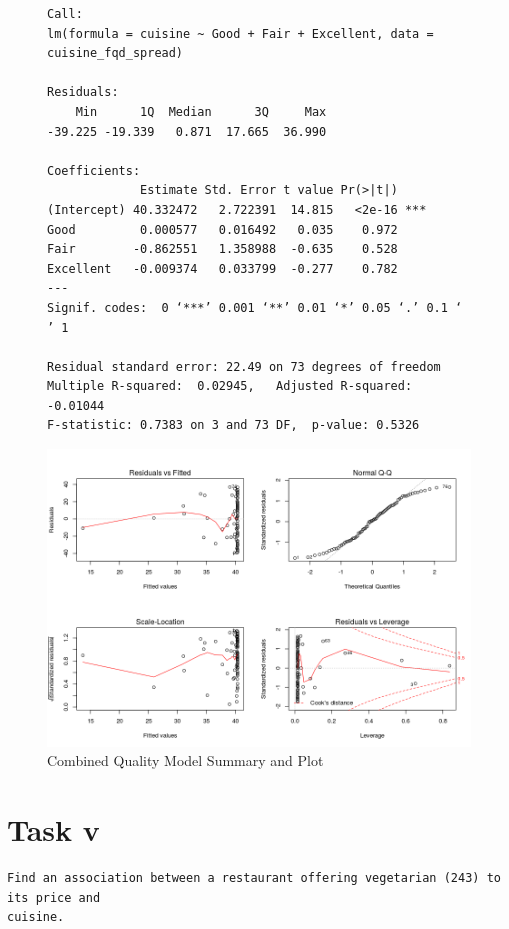\documentclass[letterpaper,10pt]{article}
\begin{document}
\begin{figure}[h]
\begin{verbatim}
Call:
lm(formula = cuisine ~ Good + Fair + Excellent, data = cuisine_fqd_spread)

Residuals:
    Min      1Q  Median      3Q     Max 
-39.225 -19.339   0.871  17.665  36.990 

Coefficients:
             Estimate Std. Error t value Pr(>|t|)    
(Intercept) 40.332472   2.722391  14.815   <2e-16 ***
Good         0.000577   0.016492   0.035    0.972    
Fair        -0.862551   1.358988  -0.635    0.528    
Excellent   -0.009374   0.033799  -0.277    0.782    
---
Signif. codes:  0 ‘***’ 0.001 ‘**’ 0.01 ‘*’ 0.05 ‘.’ 0.1 ‘ ’ 1

Residual standard error: 22.49 on 73 degrees of freedom
Multiple R-squared:  0.02945,	Adjusted R-squared:  -0.01044 
F-statistic: 0.7383 on 3 and 73 DF,  p-value: 0.5326
\end{verbatim}
\includegraphics[scale=.75]{../q4/cuisineQualityDLMPlot.png}
\caption{Combined Quality Model Summary and Plot}
\label{fig:tiv_clm}
\end{figure}

\clearpage
\newpage
{}
\section*{Task v}
\begin{verbatim}
Find an association between a restaurant offering vegetarian (243) to its price and
cuisine.
\end{verbatim}
\end{document}
